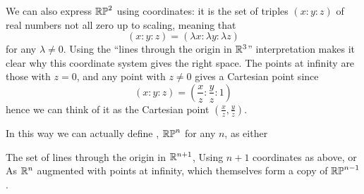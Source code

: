 We can also express $\mathbb{RP}^2$ using coordinates:
it is the set of triples $(x : y : z)$ of real numbers not all zero
up to scaling, meaning that 
\[ (x : y : z) = (\lambda x : \lambda y : \lambda z) \]
for any $\lambda \neq 0$.
Using the ``lines through the origin in $\mathbb R^3$'' interpretation
makes it clear why this coordinate system gives the right space.
The points at infinity are those with $z = 0$,
and any point with $z \neq 0$ gives a Cartesian point since
\[ (x : y : z) = \left( \frac xz : \frac yz : 1 \right) \]
hence we can think of it as the Cartesian point $(\frac xz, \frac yz)$.

In this way we can actually define ,
$\mathbb{RP}^n$ for any $n$, as either
\begin{enumerate}[(i)]
	\ii The set of lines through the origin in $\mathbb R^{n+1}$,
	\ii Using $n+1$ coordinates as above, or
	\ii As $\mathbb R^n$ augmented with points at infinity,
	which themselves form a copy of $\mathbb{RP}^{n-1}$.
\end{enumerate}

